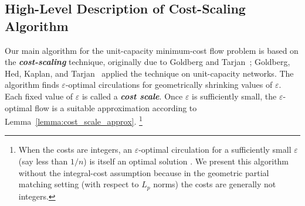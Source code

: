 \documentclass[a4paper,UKenglish]{socg-lipics-v2018}
\def\eps{\varepsilon}
\def\cost{\operatorname{cost}}
\theoremstyle{plain}
\numberwithin{figure}{section}
\def\EMPH#1{\textbf{\emph{\boldmath #1}}}
\begin{document}
\begin{toappendix}
%

\end{toappendix}



\subsection{High-Level Description of Cost-Scaling Algorithm}
\label{SS:cost-scaling}

Our main algorithm for the unit-capacity minimum-cost flow problem is based on the \EMPH{cost-scaling} technique,
originally due to Goldberg and
Tarjan~\cite{GT90}; Goldberg, Hed, Kaplan, and Tarjan~\cite{GHKT17} applied the technique on unit-capacity networks.
%
The algorithm finds $\eps$-optimal circulations for geometrically shrinking
values of $\eps$.
Each fixed value of $\eps$ is called a
\EMPH{cost scale}.
Once $\eps$ is sufficiently small, the $\eps$-optimal flow is a suitable
approximation according to Lemma~\ref{lemma:cost_scale_approx}.%
\footnote{When the costs are integers, an $\eps$-optimal circulation for a sufficiently small $\eps$ (say less than $1/n$) is itself an optimal solution \cite{GT90,GHKT17}.
We present this algorithm without the integral-cost assumption because in the geometric
partial matching setting (with respect to $L_p$ norms) the costs are generally not integers.}
\end{document}
